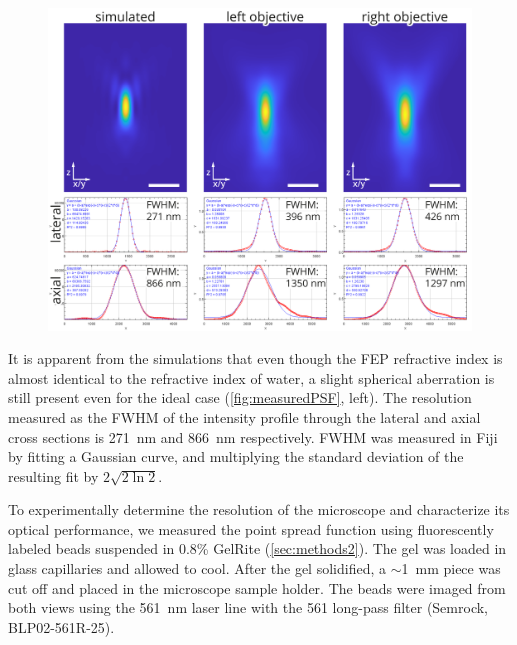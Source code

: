     \begin{figure}
      \centering
      \includegraphics[width=\textwidth]{PSF}
      \label{fig:measuredPSF}
    \end{figure}

    It is apparent from the simulations that even though the FEP refractive index is almost identical to the refractive index of water, a slight spherical aberration is still present even for the ideal case (\autoref{fig:measuredPSF}, left). The resolution measured as the FWHM of the intensity profile through the lateral and axial cross sections is \SI{271}{nm} and \SI{866}{nm} respectively. FWHM was measured in Fiji by fitting a Gaussian curve, and multiplying the standard deviation of the resulting fit by $2 \sqrt{2 \ln 2}$.

    To experimentally determine the resolution of the microscope and characterize its optical performance, we measured the point spread function using fluorescently labeled beads suspended in 0.8\% GelRite (\autoref{sec:methods2}). The gel was loaded in glass capillaries  and allowed to cool. After the gel solidified, a $\sim$\SI{1}{mm} piece was cut off and placed in the microscope sample holder. The beads were imaged from both views using the \SI{561}{nm} laser line with the 561 long-pass filter (Semrock, BLP02-561R-25).

